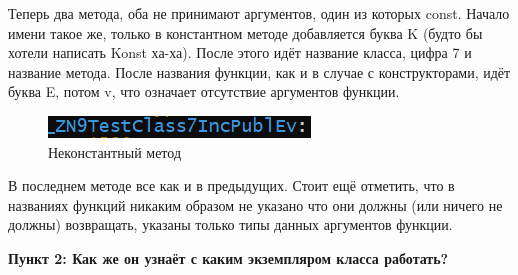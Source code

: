 \documentclass[a4paper,12pt]{article}
\begin{document}
\begin{figure}[H]\label{fig: Конст и неконст методы}
\end{figure}
Теперь два метода, оба не принимают аргументов, один из которых const. Начало имени такое же, только в константном методе добавляется буква K (будто бы хотели написать Konst ха-ха). После этого идёт название класса, цифра 7 и название метода. После названия функции, как и в случае с конструкторами, идёт буква E, потом v, что означает отсутствие аргументов функции. 
\begin{figure}[H]\label{fig: Неконст метод}
    \centering
    \includegraphics{Название неконст метод1.png}
    \caption{Неконстантный метод}
\end{figure}
В последнем методе все как и в предыдущих. Стоит ещё отметить, что в названиях функций никаким образом не указано что они должны (или ничего не должны) возвращать, указаны только типы данных аргументов функции.  

\textbf{Пункт 2: Как же он узнаёт с каким экземпляром класса работать?}
\end{document}
